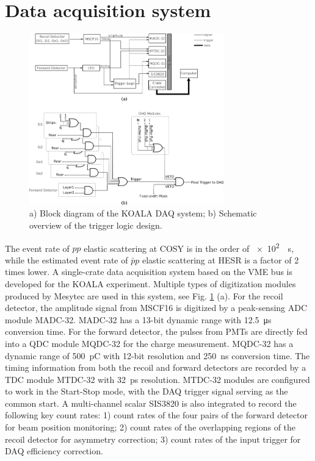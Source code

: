 \documentclass[number,5p]{elsarticle}
\begin{document}
\section{Data acquisition system}
\label{sec:daq}
\begin{figure}[bt]
  \centering
  \includegraphics[width=0.75\textwidth]{./daq_scheme.png}
  \caption{a) Block diagram of the KOALA DAQ system; b) Schematic overview of
    the trigger logic design.}
  \label{fig:trigger_logic}
\end{figure}
The event rate of $pp$ elastic scattering at COSY is in the order of \SI[per-mode=power]{e2}{\per\second},
while the estimated event rate of $\bar{p}p$ elastic scattering at HESR is a
factor of 2 times lower.
A single-crate data acquisition system based on the VME bus is developed for the KOALA experiment.
Multiple types of digitization modules produced by Mesytec \cite{mesytec} are
used in this system, see Fig. \ref{fig:trigger_logic} (a).
For the recoil detector, the amplitude signal from MSCF16 is digitized by a
peak-sensing ADC module MADC-32.
MADC-32 has a 13-bit dynamic range with \SI{12.5}{\micro\second} conversion time.
For the forward detector, the pulses from PMTs are directly fed into a QDC
module MQDC-32 for the charge measurement.
MQDC-32 has a dynamic range of \SI{500}{\pico\coulomb} with 12-bit resolution
and \SI{250}{\nano\second} conversion time.
The timing information from both the recoil and forward detectors are recorded
by a TDC module MTDC-32 with \SI{32}{\pico\second} resolution.
MTDC-32 modules are configured to work in the Start-Stop mode, with the DAQ
trigger signal serving as the common start.
A multi-channel scalar SIS3820 \cite{sis} is also integrated to record
the following key count rates: 1) count rates of the four pairs of the forward detector for beam position monitoring; 2) count rates of the overlapping regions of the recoil detector for asymmetry correction; 3) count rates of the input trigger for DAQ efficiency correction.
\end{document}
